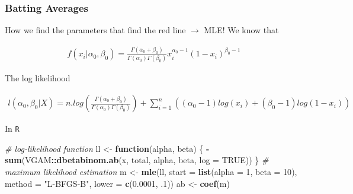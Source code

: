 \documentclass[
  shownotes,
  xcolor={svgnames},
  hyperref={colorlinks,citecolor=DarkBlue,linkcolor=DarkRed,urlcolor=DarkBlue}
  , aspectratio=169]{beamer}
\newenvironment{Shaded}{\begin{snugshade}}{\end{snugshade}}
\newcommand{\CommentTok}[1]{\textcolor[rgb]{0.56,0.35,0.01}{\textit{#1}}}
\newcommand{\ControlFlowTok}[1]{\textcolor[rgb]{0.13,0.29,0.53}{\textbf{#1}}}
\newcommand{\DataTypeTok}[1]{\textcolor[rgb]{0.13,0.29,0.53}{#1}}
\newcommand{\DecValTok}[1]{\textcolor[rgb]{0.00,0.00,0.81}{#1}}
\newcommand{\FloatTok}[1]{\textcolor[rgb]{0.00,0.00,0.81}{#1}}
\newcommand{\KeywordTok}[1]{\textcolor[rgb]{0.13,0.29,0.53}{\textbf{#1}}}
\newcommand{\NormalTok}[1]{#1}
\newcommand{\OperatorTok}[1]{\textcolor[rgb]{0.81,0.36,0.00}{\textbf{#1}}}
\newcommand{\OtherTok}[1]{\textcolor[rgb]{0.56,0.35,0.01}{#1}}
\newcommand{\StringTok}[1]{\textcolor[rgb]{0.31,0.60,0.02}{#1}}
\begin{document}
\begin{frame}[fragile]
\frametitle{Batting Averages}
How we find the parameters that find the red line $\rightarrow$ MLE! We know that

\begin{align}
f(x_i|\alpha_0,\beta_0)=\frac{\Gamma(\alpha_0+\beta_0)}{\Gamma(\alpha_0)\Gamma(\beta_0)}x_i^{\alpha_0-1}\left(1-x_i\right)^{\beta_0-1}
\end{align}

The log likelihood 
\begin{footnotesize}
\begin{align}
l(\alpha_0,\beta_0|X) = n . log(\frac{\Gamma(\alpha_0+\beta_0)}{\Gamma(\alpha_0)\Gamma(\beta_0)}) + \sum_{i=1}^n ((\alpha_0-1)log(x_i)+(\beta_0-1)log(1-x_i))
\end{align}
\end{footnotesize}


In \texttt{R}
\footnotesize
\begin{Shaded}
\begin{Highlighting}[]
\CommentTok{\# log{-}likelihood function}
\NormalTok{ll \textless{}{-}}\StringTok{ }\ControlFlowTok{function}\NormalTok{(alpha, beta) \{}
\OperatorTok{{-}}\KeywordTok{sum}\NormalTok{(VGAM}\OperatorTok{::}\KeywordTok{dbetabinom.ab}\NormalTok{(x, total, alpha, beta, }\DataTypeTok{log =} \OtherTok{TRUE}\NormalTok{))}
\NormalTok{\}}
\CommentTok{\# maximum likelihood estimation}
\NormalTok{m \textless{}{-}}\StringTok{ }\KeywordTok{mle}\NormalTok{(ll, }\DataTypeTok{start =} \KeywordTok{list}\NormalTok{(}\DataTypeTok{alpha =} \DecValTok{1}\NormalTok{, }\DataTypeTok{beta =} \DecValTok{10}\NormalTok{), }
\DataTypeTok{method =} \StringTok{"L{-}BFGS{-}B"}\NormalTok{, }\DataTypeTok{lower =} \KeywordTok{c}\NormalTok{(}\FloatTok{0.0001}\NormalTok{, }\FloatTok{.1}\NormalTok{))}
\NormalTok{ab \textless{}{-}}\StringTok{ }\KeywordTok{coef}\NormalTok{(m) }
\end{Highlighting}
\end{Shaded}


\end{frame}
\end{document}
